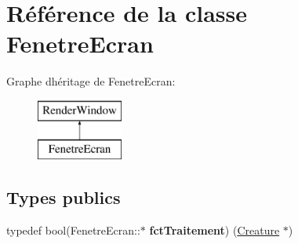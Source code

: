 \hypertarget{class_fenetre_ecran}{}\section{Référence de la classe Fenetre\+Ecran}
\label{class_fenetre_ecran}
Graphe d\textquotesingle{}héritage de Fenetre\+Ecran\+:\begin{figure}[H]
\begin{center}
\leavevmode
\includegraphics[height=2.000000cm]{class_fenetre_ecran}
\end{center}
\end{figure}
\subsection*{Types publics}
\begin{DoxyCompactItemize}
\item 
\mbox{\label{class_fenetre_ecran_aaec9d2d673614dfc27da9252491285d9}} 
typedef bool(Fenetre\+Ecran\+::$\ast$ {\bfseries fct\+Traitement}) (\mbox{\hyperlink{class_creature}{Creature}} $\ast$)
\end{DoxyCompactItemize}
